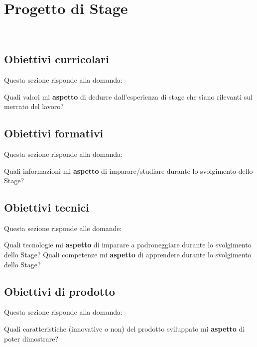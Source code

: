 
\chapter{Progetto di Stage}
\label{cap:processi-metodologie}

\\

\section{Obiettivi curricolari}

Questa sezione risponde alla domanda:

Quali valori mi \textbf{aspetto} di dedurre dall'esperienza di stage che siano rilevanti sul mercato del lavoro?


\section{Obiettivi formativi}

Questa sezione risponde alla domanda:

Quali informazioni mi \textbf{aspetto} di imparare/studiare durante lo svolgimento dello Stage?


\section{Obiettivi tecnici}

Questa sezione risponde alle domande:

Quali tecnologie mi \textbf{aspetto} di imparare a padroneggiare durante lo svolgimento dello Stage?
Quali competenze mi \textbf{aspetto} di apprendere durante lo svolgimento dello Stage?

\section{Obiettivi di prodotto}

Questa sezione risponde alla domanda:

Quali caratteristiche (innovative o non) del prodotto sviluppato mi \textbf{aspetto} di poter dimostrare?
